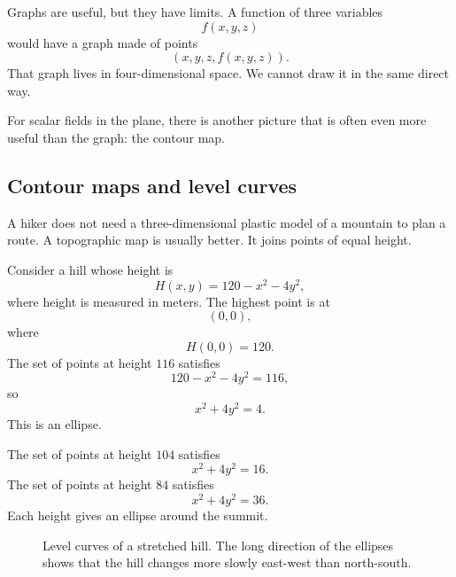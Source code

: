 Graphs are useful, but they have limits.  A function of three variables
\[
    f(x,y,z)
\]
would have a graph made of points
\[
    (x,y,z,f(x,y,z)).
\]
That graph lives in four-dimensional space.  We cannot draw it in the same direct way.

For scalar fields in the plane, there is another picture that is often even more useful
than the graph: the contour map.

\subsection{Contour maps and level curves}

A hiker does not need a three-dimensional plastic model of a mountain to plan a route.
A topographic map is usually better.  It joins points of equal height.

Consider a hill whose height is
\[
    H(x,y)=120-x^2-4y^2,
\]
where height is measured in meters.  The highest point is at
\[
    (0,0),
\]
where
\[
    H(0,0)=120.
\]
The set of points at height \(116\) satisfies
\[
    120-x^2-4y^2=116,
\]
so
\[
    x^2+4y^2=4.
\]
This is an ellipse.

The set of points at height \(104\) satisfies
\[
    x^2+4y^2=16.
\]
The set of points at height \(84\) satisfies
\[
    x^2+4y^2=36.
\]
Each height gives an ellipse around the summit.

\begin{figure}[h]
\centering
{}
\caption{Level curves of a stretched hill.  The long direction of the ellipses shows
that the hill changes more slowly east-west than north-south.}
\end{figure}

